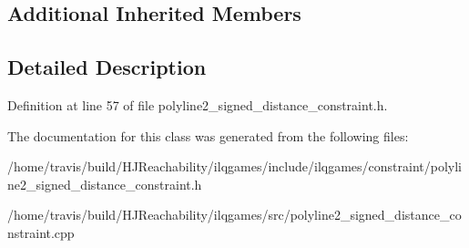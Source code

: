 \subsection*{Additional Inherited Members}


\subsection{Detailed Description}


Definition at line 57 of file polyline2\+\_\+signed\+\_\+distance\+\_\+constraint.\+h.



The documentation for this class was generated from the following files\+:\begin{DoxyCompactItemize}
\item 
/home/travis/build/\+H\+J\+Reachability/ilqgames/include/ilqgames/constraint/polyline2\+\_\+signed\+\_\+distance\+\_\+constraint.\+h\item 
/home/travis/build/\+H\+J\+Reachability/ilqgames/src/polyline2\+\_\+signed\+\_\+distance\+\_\+constraint.\+cpp\end{DoxyCompactItemize}
